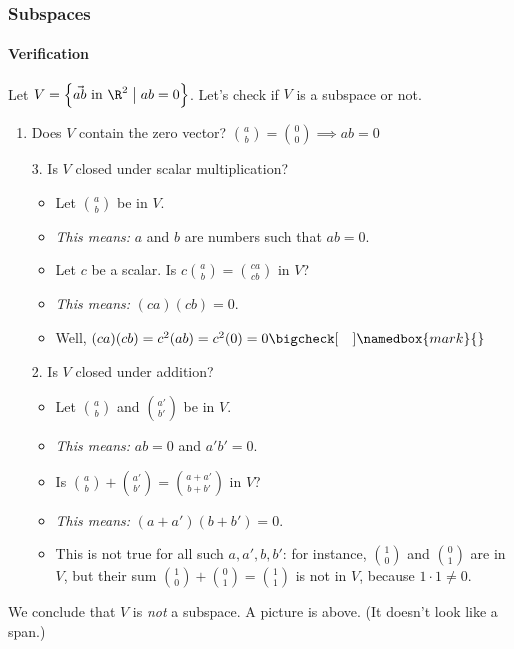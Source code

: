 
\begin{frame}
\frametitle{Subspaces}
\framesubtitle{Verification}

Let $V = \left\{ \vec{a b} \text{ in } \R^2\bigm| ab=0 \right\}$.  Let's check
if $V$ is a subspace or not.

\begin{webonly}
\begin{enumerate}
\item Does $V$ contain the zero vector?
  ${a\choose b} = {0\choose 0} \implies ab = 0$ \bigcheck[\quad]
\item[3.] Is $V$ closed under scalar multiplication?
  \begin{itemize}
  \item Let $a\choose b$ be in $V$.  
  \item \emph{This means:} $a$ and $b$ are numbers such that $ab=0$.
  \item Let $c$ be a scalar.  Is $c{a\choose b} = {ca\choose cb}$ in $V$?
  \item \emph{This means:} $(ca)(cb) = 0$.  
  \item Well, $(ca)(cb) = c^2(ab) = c^2(0) = 0 \bigcheck[\quad]\namedbox{mark}{}$
  \end{itemize}
\item[2.] Is $V$ closed under addition?
  \begin{itemize}
  \item Let $a\choose b$ and $a'\choose b'$ be in $V$.  
  \item \emph{This means:} $ab = 0$ and $a'b' = 0$.
  \item Is ${a\choose b} + {a'\choose b'} = {a+a'\choose b+b'}$ in $V$?
  \item \emph{This means:} $(a+a')(b+b')=0$.
  \item This is not true for all such $a,a',b,b'$: for instance,
    $1\choose 0$ and $0\choose 1$ are in $V$, but their sum 
    ${1\choose 0} + {0\choose 1} = {1\choose 1}$ is not in $V$, because
    $1\cdot 1\neq 0$. \bigcross
  \end{itemize}
\end{enumerate}
\end{webonly}

\pause
We conclude that $V$ is \emph{not} a subspace.
\pause
A picture is above.  (It doesn't look like a span.)

\end{frame}


